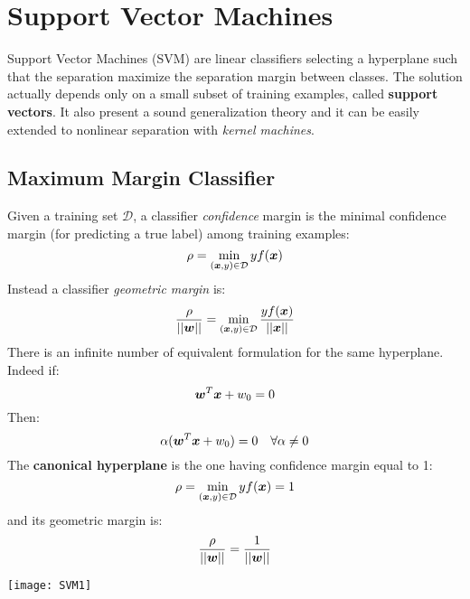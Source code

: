 \chapter{Support Vector Machines}
Support Vector Machines (SVM) are linear classifiers selecting a hyperplane such that the separation maximize the separation margin between classes. \newline
The solution actually depends only on a small subset of training examples, called \textbf{support vectors}. \newline
It also present a sound generalization theory and it can be easily extended to nonlinear separation with \textit{kernel machines}.
%
%
%
\section{Maximum Margin Classifier}
Given a training set $\mathcal{D}$, a classifier \textit{confidence} margin is the minimal confidence margin (for predicting a true label) among training examples:
\[\rho=\min\limits_{(\bm{x},y)\in\mathcal{D}}yf(\bm{x})\]
Instead a classifier \textit{geometric margin} is:
\[\frac{\rho}{\vert\vert\bm{w}\vert\vert}=\min\limits_{(\bm{x},y)\in\mathcal{D}}\frac{yf(\bm{x})}{\vert\vert\bm{x}\vert\vert}\]
There is an infinite number of equivalent formulation for the same hyperplane. Indeed if:
\[\bm{w}^T\bm{x}+w_0=0\]
Then:
\[\alpha(\bm{w}^T\bm{x}+w_0)=0\quad\forall\alpha\neq 0\]
The \textbf{canonical hyperplane} is the one having confidence margin equal to 1:
\[\rho=\min\limits_{(\bm{x},y)\in\mathcal{D}}yf(\bm{x})=1\]
and its geometric margin is:
\[\frac{\rho}{\vert\vert\bm{w}\vert\vert}=\frac{1}{\vert\vert\bm{w}\vert\vert}\]
\begin{center}
  \texttt{[image: SVM1]}
\end{center}
%
%
%
